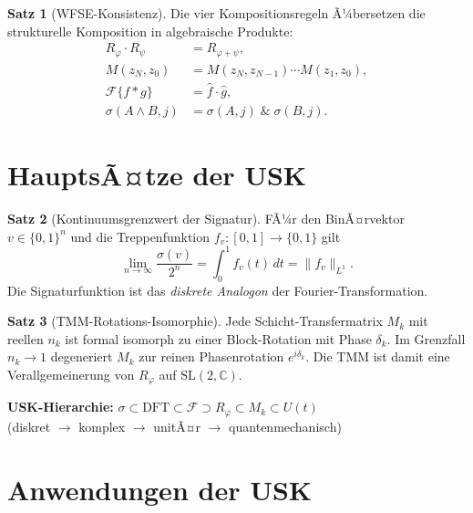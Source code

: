 ﻿\documentclass[a4paper,12pt]{scrreprt}
\theoremstyle{definition}
\newtheorem{satz}{Satz}[section]
\begin{document}
\begin{satz}[WFSE-Konsistenz]
  Die vier Kompositionsregeln Ã¼bersetzen die strukturelle Komposition
  in algebraische Produkte:
  \begin{align*}
    R_\varphi \cdot R_\psi &= R_{\varphi+\psi}, \\
    M(z_N,z_0) &= M(z_N,z_{N-1})\cdots M(z_1,z_0), \\
    \mathcal{F}\{f*g\} &= \hat f \cdot \hat g, \\
    \sigma(A\wedge B,j) &= \sigma(A,j)\;\&\;\sigma(B,j).
  \end{align*}
\end{satz}

\section{HauptsÃ¤tze der USK}
\label{sec:nf1_saetze}

\begin{satz}[Kontinuumsgrenzwert der Signatur]
  FÃ¼r den BinÃ¤rvektor $v\in\{0,1\}^n$ und die Treppenfunktion
  $f_v:[0,1]\to\{0,1\}$ gilt
  \[
    \lim_{n\to\infty}\frac{\sigma(v)}{2^n} = \int_0^1 f_v(t)\,dt = \|f_v\|_{L^1}.
  \]
  Die Signaturfunktion ist das \emph{diskrete Analogon} der Fourier-Transformation.
\end{satz}

\begin{satz}[TMM-Rotations-Isomorphie]
  Jede Schicht-Transfermatrix $M_k$ mit reellen $n_k$ ist formal isomorph
  zu einer Block-Rotation mit Phase $\delta_k$. Im Grenzfall
  $n_k\to 1$ degeneriert $M_k$ zur reinen Phasenrotation $e^{i\delta_k}$.
  Die TMM ist damit eine Verallgemeinerung von $R_\varphi$ auf
  $\mathrm{SL}(2,\mathbb{C})$.
\end{satz}

\begin{infobox}
\textbf{USK-Hierarchie:}
$\sigma \subset \mathrm{DFT} \subset \mathcal{F} \supset R_\varphi \subset M_k \subset U(t)$ \\
(diskret $\to$ komplex $\to$ unitÃ¤r $\to$ quantenmechanisch)
\end{infobox}

\section{Anwendungen der USK}
\label{sec:nf1_anwendungen}
\end{document}
